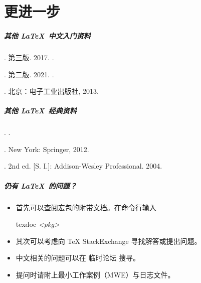 
\part{更进一步}

\begin{frame}
  \frametitle{其他 \LaTeX\ 中文入门资料}
  \begin{mybibliography}
    \item {}
     . 第三版. 2017.
    .

    \item {}
     . 第二版. 2021.
    .

    \item {}
     . 
    北京：电子工业出版社, 2013.
  \end{mybibliography}
\end{frame}

\begin{frame}
  \frametitle{其他 \LaTeX\ 经典资料}
  \begin{mybibliography}
    \item {}
     . 
    .

    \item {}
     . New York: Springer, 2012. 

    \item {}
     . 2nd ed. [S. I.]: Addison-Wesley Professional. 2004.
  \end{mybibliography}
\end{frame}

\begin{frame}
  \frametitle{仍有 \LaTeX\ 的问题？}
  \begin{itemize}
    \item 首先可以查阅宏包的附带文档。在命令行输入
    
    \hfill
    \begin{minipage}{0.3\textwidth}
      \begin{exampleblock}{\faTerminal}
        \ttfamily
        texdoc \textit{<pkg>}
      \end{exampleblock}
    \end{minipage}
    \item 其次可以考虑向 \TeX{} StackExchange  寻找解答或提出问题。
    \item 中文相关的问题可以在 \CTeX{} 临时论坛  搜寻。
    \item 提问时请附上最小工作案例（MWE）与日志文件。
  \end{itemize}
\end{frame}

